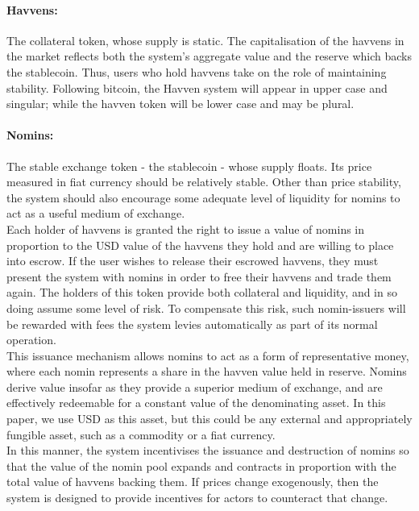 \paragraph{Havvens:} The collateral token, whose supply is static.
The capitalisation of the havvens in the market reflects both the system's aggregate value and the reserve
which backs the stablecoin. Thus, users who hold havvens take on the role of maintaining stability.
Following bitcoin, the Havven system will appear in upper case and singular; while the havven token will be lower case and may be plural.

\paragraph{Nomins:} The stable exchange token - the stablecoin - whose supply floats. Its price measured in fiat currency should be relatively stable.
Other than price stability, the system should also encourage some adequate level of liquidity for nomins
to act as a useful medium of exchange. \\

\noindent Each holder of havvens is granted the right to issue a value of nomins in proportion to the USD value
of the havvens they hold and are willing to place into escrow. If the user wishes to release their escrowed havvens, they must
present the system with nomins in order to free their havvens and trade them again.
The holders of this token provide both collateral and liquidity, and in so doing assume some
level of risk. To compensate this risk, such nomin-issuers will be rewarded with fees the system levies
automatically as part of its normal operation. \\

\noindent This issuance mechanism allows nomins to act as a form of representative money, where 
each nomin represents a share in the havven value held in reserve. Nomins derive value insofar as they provide
a superior medium of exchange, and are effectively redeemable for a constant value
of the denominating asset. In this paper, we use USD as this asset, but this could be any external
and appropriately fungible asset, such as a commodity or a fiat currency.  \\

\noindent In this manner, the system incentivises the issuance and destruction of nomins so that the value of
the nomin pool expands and contracts in proportion with the total value of havvens backing them.
If prices change exogenously, then the system is designed to provide incentives for actors to
counteract that change. \\

